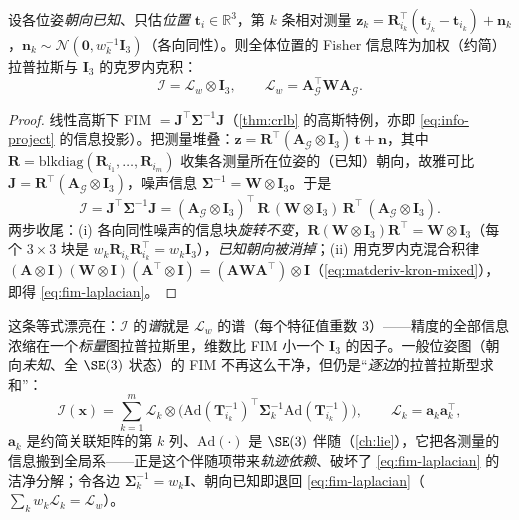 \begin{theorem}[已知朝向的位姿图：FIM $=$ 加权拉普拉斯 $\otimes\,\mathbf{I}$]\label{thm:fim-laplacian}
设各位姿\emph{朝向已知}、只估\emph{位置} $\mathbf{t}_i\in\mathbb{R}^3$，第 $k$ 条相对测量 $\mathbf{z}_k=\mathbf{R}_{i_k}^\top(\mathbf{t}_{j_k}-\mathbf{t}_{i_k})+\mathbf{n}_k$，$\mathbf{n}_k\sim\mathcal{N}(\mathbf{0},w_k^{-1}\mathbf{I}_3)$（各向同性）。则全体位置的 Fisher 信息阵为加权（约简）拉普拉斯与 $\mathbf{I}_3$ 的克罗内克积：
\begin{equation}
  \boldsymbol{\mathcal{I}}=\boldsymbol{\mathcal{L}}_w\otimes\mathbf{I}_3,\qquad \boldsymbol{\mathcal{L}}_w=\mathbf{A}_{\mathcal{G}}^\top\mathbf{W}\mathbf{A}_{\mathcal{G}}.
  \label{eq:fim-laplacian}
\end{equation}
\end{theorem}
\begin{proof}
线性高斯下 FIM $=\mathbf{J}^\top\boldsymbol{\Sigma}^{-1}\mathbf{J}$（\cref{thm:crlb} 的高斯特例，亦即 \cref{eq:info-project} 的信息投影）。把测量堆叠：$\mathbf{z}=\mathbf{R}^\top(\mathbf{A}_{\mathcal{G}}\otimes\mathbf{I}_3)\,\mathbf{t}+\mathbf{n}$，其中 $\mathbf{R}=\mathrm{blkdiag}(\mathbf{R}_{i_1},\dots,\mathbf{R}_{i_m})$ 收集各测量所在位姿的（已知）朝向，故雅可比 $\mathbf{J}=\mathbf{R}^\top(\mathbf{A}_{\mathcal{G}}\otimes\mathbf{I}_3)$，噪声信息 $\boldsymbol{\Sigma}^{-1}=\mathbf{W}\otimes\mathbf{I}_3$。于是
\[
  \boldsymbol{\mathcal{I}}=\mathbf{J}^\top\boldsymbol{\Sigma}^{-1}\mathbf{J}
  =(\mathbf{A}_{\mathcal{G}}\otimes\mathbf{I}_3)^\top\,\mathbf{R}\,(\mathbf{W}\otimes\mathbf{I}_3)\,\mathbf{R}^\top\,(\mathbf{A}_{\mathcal{G}}\otimes\mathbf{I}_3).
\]
两步收尾：(i) 各向同性噪声的信息块\emph{旋转不变}，$\mathbf{R}(\mathbf{W}\otimes\mathbf{I}_3)\mathbf{R}^\top=\mathbf{W}\otimes\mathbf{I}_3$（每个 $3\times3$ 块是 $w_k\mathbf{R}_{i_k}\mathbf{R}_{i_k}^\top=w_k\mathbf{I}_3$），\emph{已知朝向被消掉}；(ii) 用克罗内克混合积律 $(\mathbf{A}\otimes\mathbf{I})(\mathbf{W}\otimes\mathbf{I})(\mathbf{A}^\top\otimes\mathbf{I})=(\mathbf{A}\mathbf{W}\mathbf{A}^\top)\otimes\mathbf{I}$（\cref{eq:matderiv-kron-mixed}），即得 \cref{eq:fim-laplacian}。
\end{proof}
\noindent 这条等式漂亮在：$\boldsymbol{\mathcal{I}}$ 的\emph{谱}就是 $\boldsymbol{\mathcal{L}}_w$ 的谱（每个特征值重数 $3$）——精度的全部信息浓缩在一个\emph{标量}图拉普拉斯里，维数比 FIM 小一个 $\mathbf{I}_3$ 的因子。一般位姿图（朝向\emph{未知}、全 $\SE(3)$ 状态）的 FIM 不再这么干净，但仍是“\emph{逐边}的拉普拉斯型求和”\cite{carlone2026handbook}：
\begin{equation}
  \boldsymbol{\mathcal{I}}(\mathbf{x})=\sum_{k=1}^{m}\boldsymbol{\mathcal{L}}_k\otimes\Big(\mathrm{Ad}(\mathbf{T}_{i_k}^{-1})^\top\boldsymbol{\Sigma}_k^{-1}\mathrm{Ad}(\mathbf{T}_{i_k}^{-1})\Big),
  \qquad \boldsymbol{\mathcal{L}}_k=\mathbf{a}_k\mathbf{a}_k^\top,
  \label{eq:fim-laplacian-general}
\end{equation}
$\mathbf{a}_k$ 是约简关联矩阵的第 $k$ 列、$\mathrm{Ad}(\cdot)$ 是 $\SE(3)$ 伴随（\cref{ch:lie}），它把各测量的信息搬到全局系——正是这个伴随项带来\emph{轨迹依赖}、破坏了 \cref{eq:fim-laplacian} 的洁净分解；令各边 $\boldsymbol{\Sigma}_k^{-1}=w_k\mathbf{I}$、朝向已知即退回 \cref{eq:fim-laplacian}（$\sum_k w_k\boldsymbol{\mathcal{L}}_k=\boldsymbol{\mathcal{L}}_w$）。

